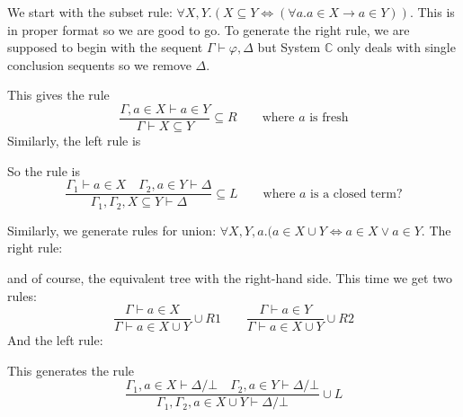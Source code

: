 \documentclass[12pt]{article}
\begin{document}
We start with the subset rule: $\forall X,Y.(X\subseteq Y\Leftrightarrow (\forall
a.a\in X\rightarrow a\in Y))$. This is in proper format so we are good to go. To
generate the right rule, we are supposed to begin with the sequent
$\Gamma\vdash\varphi,\Delta$ but System $\mathbb{C}$ only deals with single
conclusion sequents so we remove $\Delta$.
\begin{prooftree}
\end{prooftree}
This gives the rule
\[
\frac{\Gamma,a\in X\vdash a\in Y}{\Gamma\vdash X\subseteq Y}\subseteq
R\quad\quad\text{where $a$ is fresh}
\]
Similarly, the left rule is
\begin{prooftree}
\end{prooftree}
So the rule is
\[
\frac{\Gamma_1\vdash a\in X\quad\Gamma_2,a\in
Y\vdash\Delta}{\Gamma_1,\Gamma_2,X\subseteq Y\vdash\Delta}\subseteq
L\quad\quad\text{where $a$ is a closed term?}
\]

Similarly, we generate rules for union: $\forall X,Y,a.(a\in X\cup
Y\Leftrightarrow a\in X\vee a\in Y$. The right rule:
\begin{prooftree}
\end{prooftree}
and of course, the equivalent tree with the right-hand side. This time we get
two rules:
\[
\frac{\Gamma\vdash a\in X}{\Gamma\vdash a\in X\cup Y}\cup R1
\quad\quad
\frac{\Gamma\vdash a\in Y}{\Gamma\vdash a\in X\cup Y}\cup R2
\]
And the left rule:
\begin{prooftree}
\end{prooftree}
This generates the rule
\[
\frac{\Gamma_1,a\in X\vdash\Delta/\bot\quad\Gamma_2,a\in Y\vdash\Delta/\bot}
     {\Gamma_1,\Gamma_2,a\in X\cup Y\vdash\Delta/\bot}\cup L
\]
\end{document}
